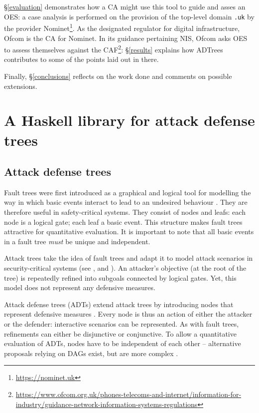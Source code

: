 \documentclass{scrreprt}
\begin{document}
\S\ref{evaluation} demonstrates how a CA might use this tool to guide and asses
an OES: a case analysis is performed on the provision of the top-level domain
\texttt{.uk} by the provider Nominet\footnote{\url{https://nominet.uk}}. As the
designated regulator for digital infrastructure, Ofcom is the CA for Nominet. In
its guidance pertaining NIS, Ofcom asks OES to assess themselves against the
CAF\footnote{\url{https://www.ofcom.org.uk/phones-telecoms-and-internet/information-for-industry/guidance-network-information-systems-regulations}}:
\S\ref{results} explains how ADTrees contributes to some of the points laid out
in there.

Finally, \S\ref{conclusions} reflects on the work done and comments on possible
extensions.

\chapter{A Haskell library for attack defense trees}
\label{tool}

\section{Attack defense trees}

Fault trees were first introduced as a graphical and logical tool for modelling
the way in which basic events interact to lead to an undesired behaviour
\cite[IV.1]{Vesely1981}. They are therefore useful in safety-critical systems.
They consist of nodes and leafs: each node is a logical gate; each leaf a basic
event. This structure makes fault trees attractive for quantitative evaluation.
It is important to note that all basic events in a fault tree \textit{must} be
unique and independent. 

Attack trees take the idea of fault trees and adapt it to model attack scenarios
in security-critical systems (see \cite{Schneier1999}, \cite{Brooke2003} and
\cite{NaiFovino2009}). An attacker's objective (at the root of the tree) is
repeatedly refined into subgoals connected by logical gates. Yet, this model
does not represent any defensive measures.

Attack defense trees (ADTs) extend attack trees by introducing nodes that
represent defensive measures \cite{KordyFoundations}. Every node is thus an
action of either the attacker or the defender: interactive scenarios can be
represented.  As with fault trees, refinements can either be disjunctive or
conjunctive. To allow a quantitative evaluation of ADTs, nodes have to be
independent of each other -- alternative proposals relying on DAGs exist, but
are more complex \cite{KordyDAG}.
\end{document}
